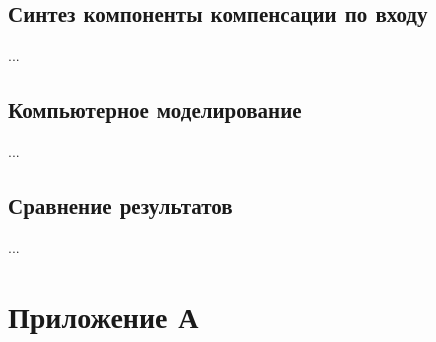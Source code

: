 \documentclass[a4paper, 12pt]{article}
\begin{document}
    \subsection{Синтез компоненты компенсации по входу}
    ...


    \subsection{Компьютерное моделирование}
    ...


    \subsection{Сравнение результатов}
    ...


    \section{Приложение А}
\end{document}
